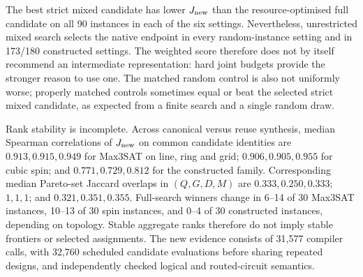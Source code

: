 The best strict mixed candidate has lower $J_{\rm new}$ than the
resource-optimised full candidate on all 90 instances in each of the six
settings. Nevertheless, unrestricted mixed search selects the native
endpoint in every random-instance setting and in 173/180 constructed
settings. The weighted score therefore does not by itself recommend an
intermediate representation: hard joint budgets provide the stronger
reason to use one. The matched random control is also not uniformly worse;
properly matched controls sometimes equal or beat the selected strict
mixed candidate, as expected from a finite search and a single random draw.

Rank stability is incomplete. Across canonical versus reuse synthesis,
median Spearman correlations of $J_{\rm new}$ on common candidate identities
are $0.913,0.915,0.949$ for Max3SAT on line, ring and grid;
$0.906,0.905,0.955$ for cubic spin; and $0.771,0.729,0.812$ for the
constructed family. Corresponding median Pareto-set Jaccard overlaps
in $(Q,G,D,M)$ are $0.333,0.250,0.333$; $1,1,1$; and
$0.321,0.351,0.355$. Full-search winners change in 6--14 of 30 Max3SAT
instances, 10--13 of 30 spin instances, and 0--4 of 30 constructed
instances, depending on topology. Stable aggregate ranks therefore do not
imply stable frontiers or selected assignments. The new evidence consists
of 31,577 compiler calls, with 32,760 scheduled candidate
evaluations before sharing repeated designs, and independently checked
logical and routed-circuit semantics.

